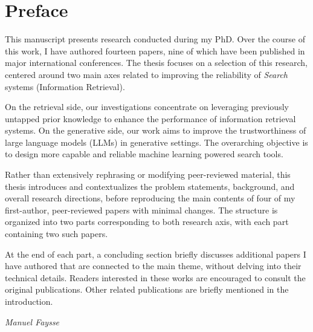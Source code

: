 \chapter*{Preface}


This manuscript presents research conducted during my PhD.  
Over the course of this work, I have authored fourteen papers, nine of which have been published in major international conferences.  
The thesis focuses on a selection of this research, centered around two main axes related to improving the reliability of \emph{Search} systems (Information Retrieval).  

On the retrieval side, our investigations concentrate on leveraging previously untapped prior knowledge to enhance the performance of information retrieval systems.  
On the generative side, our work aims to improve the trustworthiness of large language models (LLMs) in generative settings.  
The overarching objective is to design more capable and reliable machine learning powered search tools.

Rather than extensively rephrasing or modifying peer-reviewed material, this thesis introduces and contextualizes the problem statements, background, and overall research directions, before reproducing the main contents of four of my first-author, peer-reviewed papers with minimal changes.  The structure is organized into two parts corresponding to both research axis, with each part containing two such papers.

At the end of each part, a concluding section briefly discusses additional papers I have authored that are connected to the main theme, without delving into their technical details.  
Readers interested in these works are encouraged to consult the original publications.  
Other related publications are briefly mentioned in the introduction.





\begin{flushright}
	\textit{Manuel Faysse}
\end{flushright}
